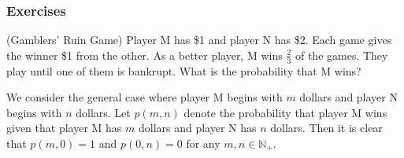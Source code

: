 \documentclass[12pt,letterpaper, onecolumn]{exam}
\begin{document}
    \subsubsection{Exercises}
    \begin{questions}
        \question[](Gamblers' Ruin Game) Player M has \$1 and player N has \$2. Each game gives the winner \$1 from the other. As a better player, M wins $\frac{2}{3}$ of the games. They play until one of them is bankrupt. What is the probability that M wins?
        \begin{solution}
            We consider the general case where player M begins with $m$ dollars and player N begins with $n$ dollars. Let $p(m,n)$ denote the probability that player M wins given that player M has $m$ dollars and player N has $n$ dollars. Then it is clear that $p(m,0)=1$ and $p(0,n)=0$ for any $m,n\in\mathbb{N}_+$.


\end{solution}
\end{questions}
\end{document}
